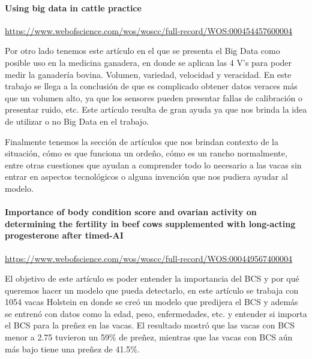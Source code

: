 \paragraph{Using big data in cattle practice}

\url{https://www.webofscience.com/wos/woscc/full-record/WOS:000454457600004}

Por otro lado tenemos este artículo en el que se presenta el Big Data como posible uso en la medicina ganadera, en donde se aplican las 4 V's para poder medir la ganadería bovina. Volumen, variedad, velocidad y veracidad. En este trabajo se llega a la conclusión de que es complicado obtener datos veraces más que un volumen alto, ya que los sensores pueden presentar fallas de calibración o presentar ruido, etc. Este artículo resulta de gran ayuda ya que nos brinda la idea de utilizar o no Big Data en el trabajo.

Finalmente tenemos la sección de artículos que nos brindan contexto de la situación, cómo es que funciona un ordeño, cómo es un rancho normalmente, entre otras cuestiones que ayudan a comprender todo lo necesario a las vacas sin entrar en aspectos tecnológicos o alguna invención que nos pudiera ayudar al modelo.

\paragraph{Importance of body condition score and ovarian activity on determining the fertility in beef cows supplemented with long-acting progesterone after timed-AI}

\url{https://www.webofscience.com/wos/woscc/full-record/WOS:000449567400004}

El objetivo de este artículo es poder entender la importancia del BCS y por qué queremos hacer un modelo que pueda detectarlo, en este artículo se trabaja con 1054 vacas Holstein en donde se creó un modelo que predijera el BCS y además se entrenó con datos como la edad, peso, enfermedades, etc. y entender si importa el BCS para la preñez en las vacas. El resultado mostró que las vacas con BCS menor a 2.75 tuvieron un 59\% de preñez, mientras que las vacas con BCS aún más bajo tiene una preñez de 41.5\%.
